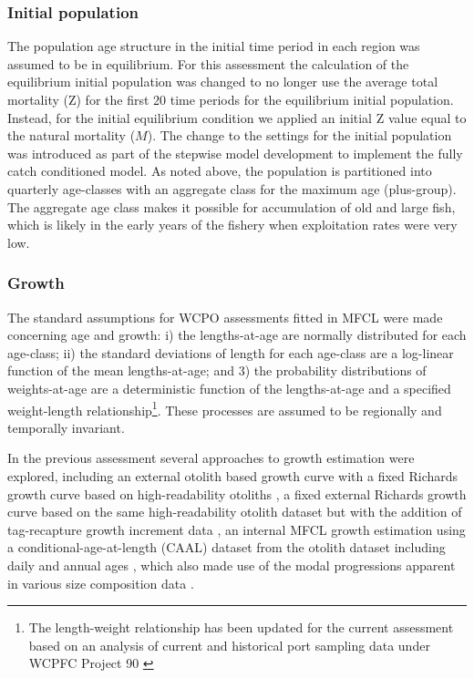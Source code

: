 \subsubsection{Initial population}
\label{sec:model_initial_population}

The population age structure in the initial time period in each region was assumed to be in equilibrium. For this assessment the calculation of the equilibrium initial population was changed to no longer use the average total mortality (Z) for the first 20 time periods for the equilibrium initial population. Instead, for the initial equilibrium condition we applied an initial Z value equal to the natural mortality ($M$). The change to the settings for the initial population was introduced as part of the stepwise model development to implement the fully catch conditioned model. As noted above, the population is partitioned into quarterly age-classes with an aggregate class for the maximum age (plus-group). The aggregate age class makes it possible for accumulation of old and large fish, which is likely in the early years of the fishery when exploitation rates were very low.

\subsubsection{Growth}
\label{sec:model_growth}

The standard assumptions for WCPO assessments fitted in MFCL were made concerning age and growth: i) the lengths-at-age are normally distributed for each age-class; ii) the standard deviations of length for each age-class are a log-linear function of the mean lengths-at-age; and 3) the probability distributions of weights-at-age are a deterministic function of the lengths-at-age and a specified weight-length relationship\footnote{The length-weight relationship has been updated for the current assessment based on an analysis of current and historical port sampling data under WCPFC Project 90 \citep{macdonald_project_2023}}. These processes are assumed to be regionally and temporally invariant.

In the previous assessment several approaches to growth estimation were explored, including an external otolith based growth curve with a fixed Richards growth curve based on high-readability otoliths \citep{farley_age_2020}, a fixed external Richards growth curve based on the same high-readability otolith dataset but with the addition of tag-recapture growth increment data \citep{eveson_integrated_2020}, an internal MFCL  growth estimation using a conditional-age-at-length (CAAL) dataset from the otolith dataset including daily and annual ages \citep{farley_age_2020}, which also made use of the modal progressions apparent in various size composition data \citep{vincent_stock_2020}.

